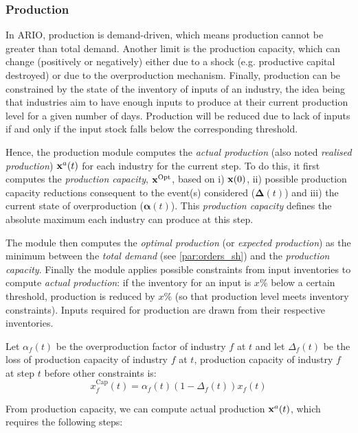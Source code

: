 \subsubsection{Production}
\label{par:prod_sh}

In ARIO, production is demand-driven, which means production cannot be greater
than total demand. Another limit is the production capacity, which can change
(positively or negatively) either due to a shock (e.g. productive capital
destroyed) or due to the overproduction mechanism. Finally, production can be
constrained by the state of the inventory of inputs of an industry, the idea
being that industries aim to have enough inputs to produce at
their current production level for a given number of days. Production will
be reduced due to lack of inputs if and only if the input stock falls below the
corresponding threshold.

Hence, the production module computes the \emph{actual production} (also noted
\emph{realised production}) $\mathbf{x}^a(t)$ for each industry for the
current step. To do this, it first computes the \emph{production
  capacity}, $\mathbf{x}^{\textrm{Opt}}$, based on i) $\mathbf{x}(0)$, ii) possible production
capacity reductions consequent to the event(s) considered ($\bm{\Delta}(t)$) and
iii) the current state of overproduction ($\bm{\alpha}(t)$). This \emph{production
  capacity} defines the absolute maximum each industry can produce at this step.

The module then computes the \emph{optimal production} (or \emph{expected
  production}) as the minimum between the \emph{total demand} (see
\cref{par:orders_sh}) and the \emph{production capacity}. Finally the module
applies possible constraints from input
inventories to compute \emph{actual production}: if the inventory for
an input is $x$\% below a certain threshold, production is reduced by $x$\% (so
that production level meets inventory constraints). Inputs required for
production are drawn from their respective inventories.

Let \(\alpha_{f}(t)\) be the overproduction factor of industry
\(f\) at $t$ and let \(\Delta_{f}(t)\) be the loss of production capacity of
industry \(f\) at $t$, production capacity of industry \(f\) at step \(t\)
before other constraints is:
\begin{equation*}
  x^{\textrm{Cap}}_{f}(t) = \alpha_{f}(t) (1 - \Delta_{f}(t)) x_{f}(t)
\end{equation*}

From production capacity, we can compute actual production $\mathbf{x}^{a}(t)$, which requires the
following steps:

